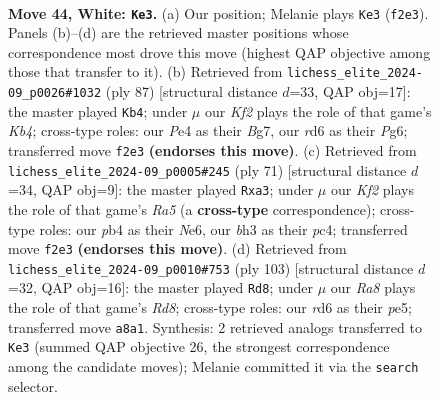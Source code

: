 \documentclass[11pt]{article}
\begin{document}
\clearpage

\begin{figure}[p]\centering
\begin{subfigure}{0.46\textwidth}\centering
\resizebox{\linewidth}{!}{%
\newchessgame
\chessboard[
  setfen={R7/5p1p/3r2pk/8/1p2P3/6Pb/5K1P/6nr w - - 4 44},
  showmover=false,
  pgfstyle=straightmove, color=movearrow, markmove={f2-e3}
]}
\caption{}
\end{subfigure}\hfill
\begin{subfigure}{0.46\textwidth}\centering
\resizebox{\linewidth}{!}{%
\newchessgame
\chessboard[
  setfen={8/5pb1/6p1/1kp3P1/p4P2/4PK2/1PRN4/3r4 b - - 8 44},
  showmover=false,
  pgfstyle=straightmove, color=movearrow, markmove={b5-b4}
]}
\caption{}
\end{subfigure}
\\[4pt]
\begin{subfigure}{0.46\textwidth}\centering
\resizebox{\linewidth}{!}{%
\newchessgame
\chessboard[
  setfen={8/5Rp1/2p1n2p/4k3/r1P5/P5NP/5PP1/5K2 b - - 0 36},
  showmover=false,
  pgfstyle=straightmove, color=movearrow, markmove={a4-a3}
]}
\caption{}
\end{subfigure}\hfill
\begin{subfigure}{0.46\textwidth}\centering
\resizebox{\linewidth}{!}{%
\newchessgame
\chessboard[
  setfen={6R1/8/7k/4PBN1/5pPp/1P3P2/P3K3/3r4 b - - 6 52},
  showmover=false,
  pgfstyle=straightmove, color=movearrow, markmove={d1-d8}
]}
\caption{}
\end{subfigure}
\caption{\textbf{Move 44, White: \texttt{Ke3}.} (a) Our position; Melanie plays \texttt{Ke3} (\texttt{f2e3}). Panels (b)--(d) are the retrieved master positions whose correspondence most drove this move (highest QAP objective among those that transfer to it). (b) Retrieved from \texttt{lichess\_elite\_2024-09\_p0026\#1032} (ply 87) [structural distance $d$=33, QAP obj=17]: the master played \texttt{Kb4}; under $\mu$ our \emph{Kf2} plays the role of that game's \emph{Kb4}; cross-type roles: our \emph{P}e4 as their \emph{B}g7, our \emph{r}d6 as their \emph{P}g6; transferred move \texttt{f2e3} \textbf{(endorses this move)}. (c) Retrieved from \texttt{lichess\_elite\_2024-09\_p0005\#245} (ply 71) [structural distance $d$=34, QAP obj=9]: the master played \texttt{Rxa3}; under $\mu$ our \emph{Kf2} plays the role of that game's \emph{Ra5} (a \textbf{cross-type} correspondence); cross-type roles: our \emph{p}b4 as their \emph{N}e6, our \emph{b}h3 as their \emph{p}c4; transferred move \texttt{f2e3} \textbf{(endorses this move)}. (d) Retrieved from \texttt{lichess\_elite\_2024-09\_p0010\#753} (ply 103) [structural distance $d$=32, QAP obj=16]: the master played \texttt{Rd8}; under $\mu$ our \emph{Ra8} plays the role of that game's \emph{Rd8}; cross-type roles: our \emph{r}d6 as their \emph{p}e5; transferred move \texttt{a8a1}. Synthesis: 2 retrieved analogs transferred to \texttt{Ke3} (summed QAP objective 26, the strongest correspondence among the candidate moves); Melanie committed it via the \texttt{search} selector.}
\label{fig:thought-m86}
\end{figure}
\end{document}
